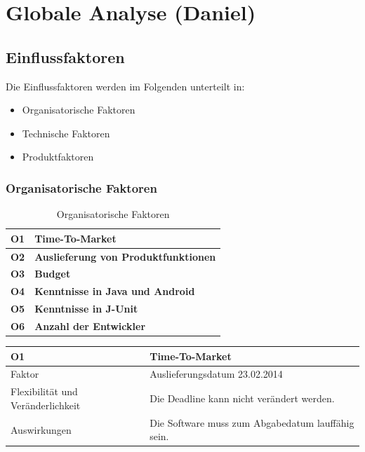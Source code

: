 \documentclass[fontsize=12pt,paper=a4,twoside]{scrartcl}
\begin{document}
\newpage

\section{Globale Analyse (Daniel)}
\label{sec:globale_analyse}

\subsection{Einflussfaktoren}
\label{sec:einflussfaktoren}

Die Einflussfaktoren werden im Folgenden unterteilt in:

\begin{itemize}
\item{Organisatorische Faktoren}
\item{Technische Faktoren}
\item{Produktfaktoren}
\end{itemize}

\subsubsection{Organisatorische Faktoren}
\label{sec:orgfaktoren}

\begin{table}[H]
\centering
\caption{Organisatorische Faktoren}
\begin{tabular}{|l|l|} \hline
\textbf{O1} & \textbf{Time-To-Market} \\ \hline
\textbf{O2} & \textbf{Auslieferung von Produktfunktionen} \\ \hline
\textbf{O3} & \textbf{Budget} \\ \hline
\textbf{O4} & \textbf{Kenntnisse in Java und Android} \\ \hline
\textbf{O5} & \textbf{Kenntnisse in J-Unit} \\ \hline
\textbf{O6} & \textbf{Anzahl der Entwickler}\\ \hline
\end{tabular}
\end{table}

\begin{table}[H]
\begin{tabular}{|p{3cm}|p{12cm}|}\hline
\textbf{O1} & \textbf{Time-To-Market}\\ \hline \hline
Faktor & Auslieferungsdatum 23.02.2014\\ \hline
Flexibilität und Veränderlichkeit & Die Deadline kann nicht verändert werden.\\ \hline
Auswirkungen & Die Software muss zum Abgabedatum lauffähig sein.\\ \hline
\end{tabular}
\end{table}
\end{document}

